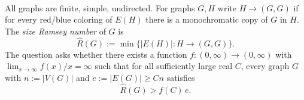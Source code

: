 \\
All graphs are finite, simple, undirected. For graphs $G,H$ write $H\to (G,G)$ if for every red/blue coloring of $E(H)$ there is a monochromatic copy of $G$ in $H$. The \emph{size Ramsey number} of $G$ is
\[
\hat R(G):=\min\{|E(H)|: H\to (G,G)\}.
\]
The question asks whether there exists a function $f:(0,\infty)\to (0,\infty)$ with $\lim_{x\to\infty} f(x)/x=\infty$ such that for all sufficiently large real $C$, every graph $G$ with $n:=|V(G)|$ and $e:=|E(G)|\ge Cn$ satisfies
\[
\hat R(G) > f(C)\, e.
\]
